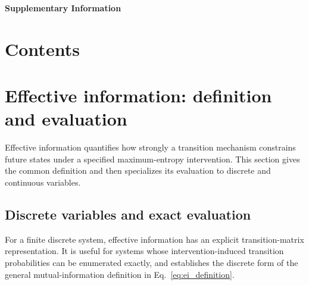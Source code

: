 \documentclass[fleqn,10pt]{wlscirep}
\begin{document}
\clearpage

{}

\begin{center}
    {\LARGE\bfseries Supplementary Information\par}
\end{center}

\vspace{1em}

\begingroup
\setcounter{tocdepth}{2}

\setlength{\parskip}{0pt}
\section*{Contents}
\makeatletter
\renewcommand*{\l@subsection}{\@dottedtocline{2}{0.8em}{3.0em}}
\hfuzz=1pt
\makeatother
\endgroup

\clearpage

\appendix
\setcounter{section}{0}
\setcounter{equation}{0}

\renewcommand{\thesection}{S\arabic{section}}
\renewcommand{\theequation}{S\arabic{equation}}




\section{Effective information: definition and evaluation}
\label{app:effective_information}
Effective information quantifies how strongly a transition mechanism constrains future states under a specified maximum-entropy intervention. This section gives the common definition and then specializes its evaluation to discrete and continuous variables.\subsection{Discrete variables and exact evaluation}
\label{app:discrete_ei}

For a finite discrete system, effective information has an explicit transition-matrix representation. 
It is useful
for systems whose intervention-induced transition probabilities can be
enumerated exactly, and establishes the discrete form of the general
mutual-information definition in Eq.~\eqref{eq:ei_definition}.
\end{document}
